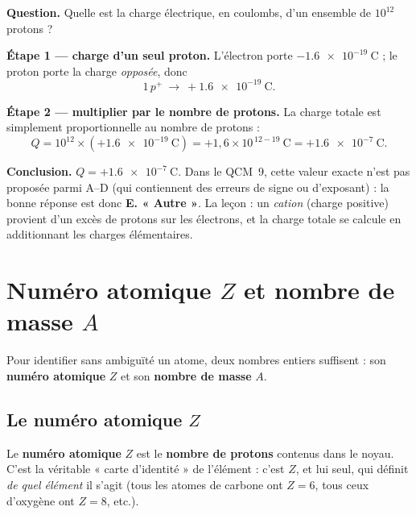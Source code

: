 \documentclass[11pt,a4paper]{article}
\newcommand{\pp}{p^{+}}      %
\begin{document}
\begin{exemple}
\textbf{Question.} Quelle est la charge électrique, en coulombs, d'un ensemble de \(10^{12}\) protons ?

\smallskip
\textbf{Étape 1 — charge d'un seul proton.} L'électron porte $-\SI{1,6e-19}{\coulomb}$ ; le proton
porte la charge \emph{opposée}, donc
\[ 1\,\pp \ \longrightarrow\ +\SI{1,6e-19}{\coulomb}. \]

\textbf{Étape 2 — multiplier par le nombre de protons.} La charge totale est simplement
proportionnelle au nombre de protons :
\[ Q = 10^{12} \times (+\SI{1,6e-19}{\coulomb}) = +1{,}6\times 10^{\,12-19}\ \si{\coulomb}
     = +\SI{1,6e-7}{\coulomb}. \]

\textbf{Conclusion.} \(Q = +\SI{1,6e-7}{\coulomb}\). Dans le QCM~9, cette valeur exacte n'est pas
proposée parmi A–D (qui contiennent des erreurs de signe ou d'exposant) : la bonne réponse est donc
\textbf{E. « Autre »}. La leçon : un \emph{cation} (charge positive) provient d'un excès de protons
sur les électrons, et la charge totale se calcule en additionnant les charges élémentaires.
\end{exemple}

\section{Numéro atomique \texorpdfstring{$Z$}{Z} et nombre de masse \texorpdfstring{$A$}{A}}
Pour identifier sans ambiguïté un atome, deux nombres entiers suffisent : son \textbf{numéro atomique}
$Z$ et son \textbf{nombre de masse} $A$.

\subsection{Le numéro atomique \texorpdfstring{$Z$}{Z}}

\begin{definition}
Le \textbf{numéro atomique} $Z$ est le \textbf{nombre de protons} contenus dans le noyau. C'est la
véritable « carte d'identité » de l'élément : c'est $Z$, et lui seul, qui définit \emph{de quel élément}
il s'agit (tous les atomes de carbone ont $Z = 6$, tous ceux d'oxygène ont $Z = 8$, etc.).
\end{definition}
\end{document}
